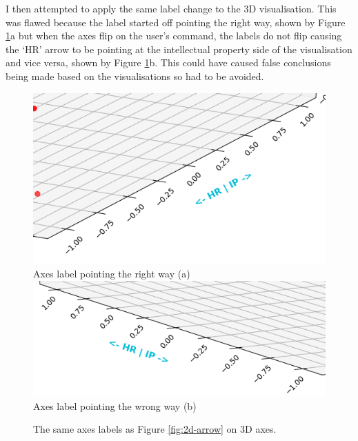 			I then attempted to apply the same label change to the 3D visualisation. This was flawed because the label started off pointing the right way, shown by Figure \ref{fig:axis-switch}a but when the axes flip on the user's command, the labels do not flip causing the `HR' arrow to be pointing at the intellectual property side of the visualisation and vice versa, shown by Figure \ref{fig:axis-switch}b. This could have caused false conclusions being made based on the visualisations so had to be avoided.
			\begin{figure}
					\centering
  					\includegraphics[width=\linewidth]{resources/images/3d_point_correct.png}\\
  					Axes label pointing the right way (a)
  				\endminipage\hfill
  					\centering
  					\includegraphics[width=\linewidth]{resources/images/3d_point_incorrect.png}\\
  					\vspace{1.5cm}
  					Axes label pointing the wrong way (b)
  				\endminipage\hfill\caption{The same axes labels as Figure \ref{fig:2d-arrow} on 3D axes.}\label{fig:axis-switch}
			\end{figure}
			

